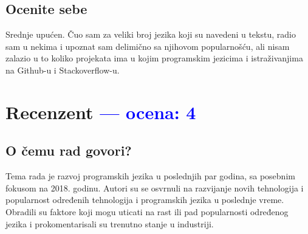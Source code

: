 \documentclass[a4paper]{report}
\newcommand{\odgovor}[1]{\textcolor{blue}{#1}}
\begin{document}
\section{Ocenite sebe}
Srednje upućen. Čuo sam za veliki broj jezika koji su navedeni u tekstu, radio sam u nekima i upoznat sam delimično sa njihovom popularnošću, ali nisam zalazio u to koliko projekata ima u kojim programskim jezicima i istraživanjima na Github-u i Stackoverflow-u.


\chapter{Recenzent \odgovor{--- ocena: 4} }


\section{O čemu rad govori?}
Tema rada je razvoj programskih jezika u poslednjih par godina, sa posebnim fokusom na 2018. godinu. Autori su se osvrnuli na razvijanje novih tehnologija i popularnost određenih tehnologija i programskih jezika u poslednje vreme. Obradili su faktore koji mogu uticati na rast ili pad popularnosti određenog jezika i prokomentarisali su trenutno stanje u industriji.
\end{document}
